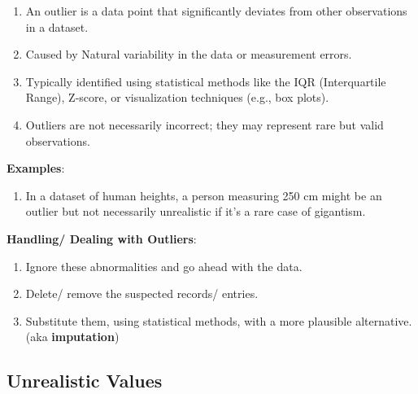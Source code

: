 \begin{enumerate}
    \item An outlier is a data point that significantly deviates from other observations in a dataset. \hfill \cite{common/online/chatgpt}

    \item Caused by Natural variability in the data or measurement errors. \hfill \cite{common/online/chatgpt}

    \item Typically identified using statistical methods like the IQR (Interquartile Range), Z-score, or visualization techniques (e.g., box plots). \hfill \cite{common/online/chatgpt}

    \item Outliers are not necessarily incorrect; they may represent rare but valid observations. \hfill \cite{common/online/chatgpt}
    
\end{enumerate}


\vspace{0.3cm}

\textbf{Examples}:
\begin{enumerate}
    \item In a dataset of human heights, a person measuring 250 cm might be an outlier but not necessarily unrealistic if it’s a rare case of gigantism. \hfill \cite{common/online/chatgpt}
\end{enumerate}


\vspace{0.3cm}
\textbf{Handling/ Dealing with Outliers}:
\begin{enumerate}
    \item Ignore these abnormalities and go ahead with the data. \hfill \cite{statistics/book/Statistics-for-Data-Scientists/Maurits-Kaptein}

    \item Delete/ remove the suspected records/ entries. \hfill \cite{statistics/book/Statistics-for-Data-Scientists/Maurits-Kaptein}

    \item Substitute them, using statistical methods, with a more plausible alternative. (aka \textbf{imputation}) \hfill \cite{statistics/book/Statistics-for-Data-Scientists/Maurits-Kaptein}\label{Data/Outliers/imputation}
\end{enumerate}




\subsection{Unrealistic Values \cite{statistics/book/Statistics-for-Data-Scientists/Maurits-Kaptein}}\label{Data/Measurement-Levels/Unrealistic Values}

